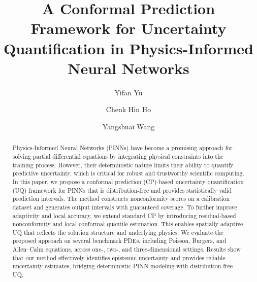 \documentclass[preprint,12pt]{elsarticle}
\begin{document}
\begin{frontmatter}

\title{A Conformal Prediction Framework for Uncertainty Quantification in Physics-Informed Neural Networks}

\author[nusaddress]{Yifan Yu}

\author[ubcaddress]{Cheuk Hin Ho}

\author[nusaddress]{Yangshuai Wang}

\address[nusaddress]{Department of Mathematics, National University of Singapore, 10 Lower Kent Ridge Road, 119076, Singapore.}

\address[ubcaddress]{Department of Mathematics, University of British Columbia, Vancouver, V6T1Z2, Canada.}

\begin{abstract}
Physics-Informed Neural Networks (PINNs) have become a promising approach for solving partial differential equations by integrating physical constraints into the training process. However, their deterministic nature limits their ability to quantify predictive uncertainty, which is critical for robust and trustworthy scientific computing. In this paper, we propose a conformal prediction (CP)-based uncertainty quantification (UQ) framework for PINNs that is distribution-free and provides statistically valid prediction intervals. The method constructs nonconformity scores on a calibration dataset and generates output intervals with guaranteed coverage. To further improve adaptivity and local accuracy, we extend standard CP by introducing residual-based nonconformity and local conformal quantile estimation. This enables spatially adaptive UQ that reflects the solution structure and underlying physics. We evaluate the proposed approach on several benchmark PDEs, including Poisson, Burgers, and Allen–Cahn equations, across one-, two-, and three-dimensional settings. Results show that our method effectively identifies epistemic uncertainty and provides reliable uncertainty estimates, bridging deterministic PINN modeling with distribution-free UQ.
\end{abstract}




\end{frontmatter}
\end{document}
